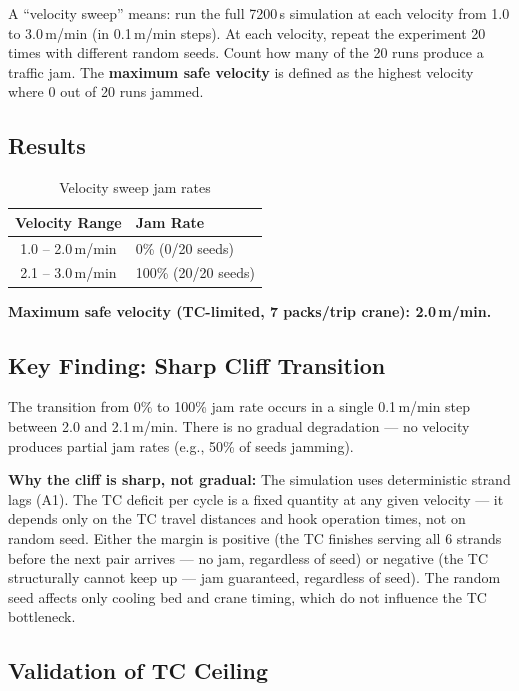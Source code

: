\documentclass[11pt,a4paper]{article}
\begin{document}
A ``velocity sweep'' means: run the full 7200\,s simulation at each velocity from 1.0 to 3.0\,m/min (in 0.1\,m/min steps). At each velocity, repeat the experiment 20 times with different random seeds. Count how many of the 20 runs produce a traffic jam. The \textbf{maximum safe velocity} is defined as the highest velocity where 0 out of 20 runs jammed.

\subsection{Results}

\begin{table}[H]
\centering
\caption{Velocity sweep jam rates}
\label{tab:sweep-results}
\begin{tabular}{@{}cl@{}}
\toprule
Velocity Range & Jam Rate \\
\midrule
1.0 -- 2.0\,m/min & 0\% (0/20 seeds) \\
2.1 -- 3.0\,m/min & 100\% (20/20 seeds) \\
\bottomrule
\end{tabular}
\end{table}

\textbf{Maximum safe velocity (TC-limited, 7 packs/trip crane): 2.0\,m/min.}

\subsection{Key Finding: Sharp Cliff Transition}

The transition from 0\% to 100\% jam rate occurs in a single 0.1\,m/min step between 2.0 and 2.1\,m/min. There is no gradual degradation --- no velocity produces partial jam rates (e.g., 50\% of seeds jamming).

\textbf{Why the cliff is sharp, not gradual:} The simulation uses deterministic strand lags (A1). The TC deficit per cycle is a fixed quantity at any given velocity --- it depends only on the TC travel distances and hook operation times, not on random seed. Either the margin is positive (the TC finishes serving all 6 strands before the next pair arrives --- no jam, regardless of seed) or negative (the TC structurally cannot keep up --- jam guaranteed, regardless of seed). The random seed affects only cooling bed and crane timing, which do not influence the TC bottleneck.

\subsection{Validation of TC Ceiling}
\end{document}

